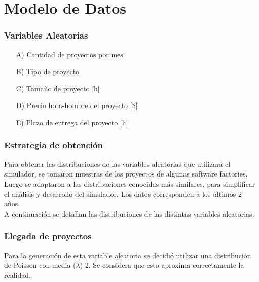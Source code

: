 \part*{Modelo de Datos}

\section{Variables Aleatorias}

\begin{itemize}
    \item[A)] Cantidad de proyectos por mes
    \item[B)] Tipo de proyecto
    \item[C)] Tamaño de proyecto [h]
    \item[D)] Precio hora-hombre del proyecto [\$]
    \item[E)] Plazo de entrega del proyecto [h]
\end{itemize}

\section{Estrategia de obtención}

Para obtener las distribuciones de las variables aleatorias que utilizará el simulador, se tomaron muestras de los proyectos de algunas software factories. Luego se 
adaptaron a las distribuciones conocidas más similares, para simplificar el análisis y desarrollo del simulador. Los datos corresponden a los últimos 2 años. \\

A continuación se detallan las distribuciones de las distintas variables aleatorias.\\

\section*{Llegada de proyectos}
Para la generación de esta variable aleatoria se decidió utilizar una distribución de Poisson con media ($\lambda$) 2. Se considera que esto aproxima correctamente
la realidad. \\

